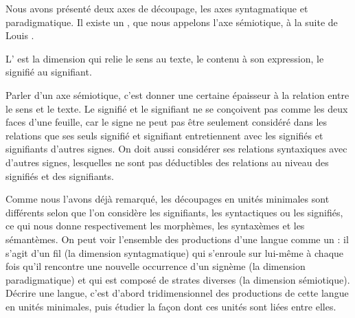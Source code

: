 Nous avons présenté deux axes de découpage, les axes syntagmatique et paradigmatique. Il existe un , que nous appelons l’axe sémiotique, à la suite de Louis \citet[66]{hjelmslev1943omkring}.

{L’ est la dimension qui relie le sens au texte, le contenu à son expression, le signifié au signifiant.}

Parler d’un axe sémiotique, c’est donner une certaine épaisseur à la relation entre le sens et le texte. Le signifié et le signifiant ne se conçoivent pas comme les deux faces d’une feuille, car le signe ne peut pas être seulement considéré dans les relations que ses seuls signifié et signifiant entretiennent avec les signifiés et signifiants d’autres signes. On doit aussi considérer ses relations syntaxiques avec d’autres signes, lesquelles ne sont pas déductibles des relations au niveau des signifiés et des signifiants.

Comme nous l’avons déjà remarqué, les découpages en unités minimales sont différents selon que l’on considère les signifiants, les syntactiques ou les signifiés, ce qui nous donne respectivement les morphèmes, les syntaxèmes et les sémantèmes. On peut voir l’ensemble des productions d’une langue comme un : il s’agit d’un fil (la dimension syntagmatique) qui s’enroule sur lui-même à chaque fois qu’il rencontre une nouvelle occurrence d’un signème (la dimension paradigmatique) et qui est composé de strates diverses (la dimension sémiotique). Décrire une langue, c’est d’abord  tridimensionnel des productions de cette langue en unités minimales, puis étudier la façon dont ces unités sont liées entre elles.


